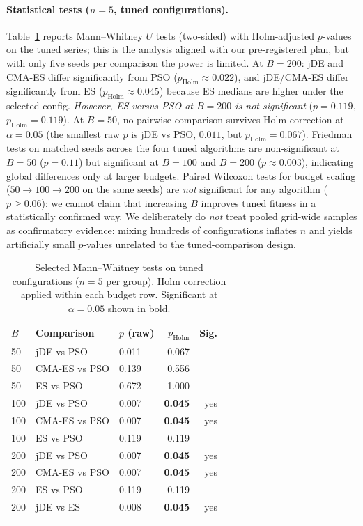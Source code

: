 \documentclass[pdflatex,sn-mathphys-num]{sn-jnl}
\begin{document}
\paragraph{Statistical tests ($n=5$, tuned configurations).}
Table~\ref{tab:stats-tuned} reports Mann--Whitney $U$ tests (two-sided) with Holm-adjusted $p$-values on the tuned series; this is the analysis aligned with our pre-registered plan, but with only five seeds per comparison the power is limited.
At $B=200$: jDE and CMA-ES differ significantly from PSO ($p_{\mathrm{Holm}}\approx0.022$), and jDE/CMA-ES differ significantly from ES ($p_{\mathrm{Holm}}\approx0.045$) because ES medians are higher under the selected config.
\emph{However, ES versus PSO at $B=200$ is not significant} ($p=0.119$, $p_{\mathrm{Holm}}=0.119$).
At $B=50$, no pairwise comparison survives Holm correction at $\alpha=0.05$ (the smallest raw $p$ is jDE vs PSO, $0.011$, but $p_{\mathrm{Holm}}=0.067$).
Friedman tests on matched seeds across the four tuned algorithms are non-significant at $B=50$ ($p=0.11$) but significant at $B=100$ and $B=200$ ($p\approx0.003$), indicating global differences only at larger budgets.
Paired Wilcoxon tests for budget scaling ($50\to100\to200$ on the same seeds) are \emph{not} significant for any algorithm ($p\ge0.06$): we cannot claim that increasing $B$ improves tuned fitness in a statistically confirmed way.
We deliberately do \emph{not} treat pooled grid-wide samples as confirmatory evidence: mixing hundreds of configurations inflates $n$ and yields artificially small $p$-values unrelated to the tuned-comparison design.

\begin{table}[t]
\centering
\caption{Selected Mann--Whitney tests on tuned configurations ($n=5$ per group). Holm correction applied within each budget row. Significant at $\alpha=0.05$ shown in bold.}\label{tab:stats-tuned}
\large
\setlength{\tabcolsep}{10pt}
\renewcommand{\arraystretch}{1.45}
\begin{tabular}{l l l r r c}
\toprule
$B$ & Comparison & $p$ (raw) & $p_{\mathrm{Holm}}$ & Sig. \\
\midrule
50  & jDE vs PSO   & 0.011 & 0.067 & \\
50  & CMA-ES vs PSO & 0.139 & 0.556 & \\
50  & ES vs PSO    & 0.672 & 1.000 & \\
\midrule
100 & jDE vs PSO   & 0.007 & \textbf{0.045} & yes \\
100 & CMA-ES vs PSO & 0.007 & \textbf{0.045} & yes \\
100 & ES vs PSO    & 0.119 & 0.119 & \\
\midrule
200 & jDE vs PSO   & 0.007 & \textbf{0.045} & yes \\
200 & CMA-ES vs PSO & 0.007 & \textbf{0.045} & yes \\
200 & ES vs PSO    & 0.119 & 0.119 & \\
200 & jDE vs ES    & 0.008 & \textbf{0.045} & yes \\
\botrule
\end{tabular}
\normalsize
\end{table}
\end{document}
